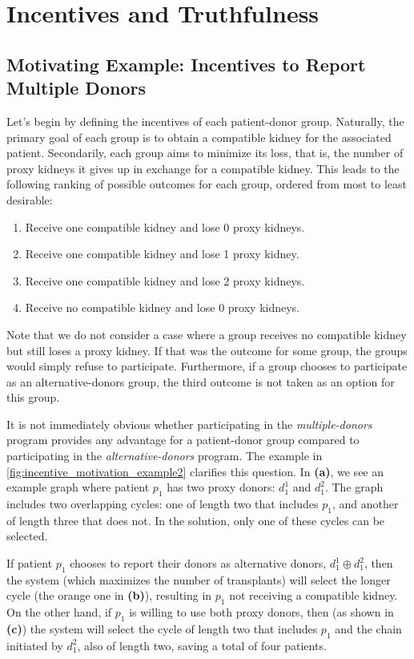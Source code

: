 \chapter{Incentives and Truthfulness}
\label{cha:incentives_and_truthfulness}


\section{Motivating Example: Incentives to Report Multiple Donors}
\label{sec:incentives}

Let's begin by defining the incentives of each patient-donor group. Naturally, the primary goal of each group is to obtain a compatible kidney for the associated patient. Secondarily, each group aims to minimize its loss, that is, the number of proxy kidneys it gives up in exchange for a compatible kidney. This leads to the following ranking of possible outcomes for each group, ordered from most to least desirable:

\begin{enumerate}
\item Receive one compatible kidney and lose 0 proxy kidneys.
\item Receive one compatible kidney and lose 1 proxy kidney.
\item Receive one compatible kidney and lose 2 proxy kidneys.
\item Receive no compatible kidney and lose 0 proxy kidneys.
\end{enumerate}

Note that we do not consider a case where a group receives no compatible kidney but still loses a proxy kidney. If that was the outcome for some group, the groups would simply refuse to participate. Furthermore, if a group chooses to participate as an alternative-donors group, the third outcome is not taken as an option for this group.

It is not immediately obvious whether participating in the \textit{multiple-donors} program provides any advantage for a patient-donor group compared to participating in the \textit{alternative-donors} program. The example in \autoref{fig:incentive_motivation_example2} clarifies this question. In \textbf{(a)}, we see an example graph where patient $p_1$ has two proxy donors: $d_1^1$ and $d_1^2$. The graph includes two overlapping cycles: one of length two that includes $p_1$, and another of length three that does not. In the solution, only one of these cycles can be selected.

If patient $p_1$ chooses to report their donors as alternative donors, $d_1^1 \oplus d_1^2$, then the system (which maximizes the number of transplants) will select the longer cycle (the orange one in \textbf{(b)}), resulting in $p_1$ not receiving a compatible kidney. On the other hand, if $p_1$ is willing to use both proxy donors, then (as shown in \textbf{(c)}) the system will select the cycle of length two that includes $p_1$ and the chain initiated by $d_1^2$, also of length two, saving a total of four patients.

